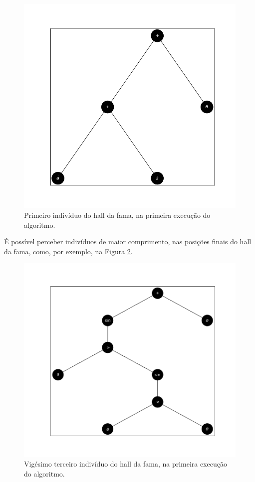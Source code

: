 \begin{figure}[H]
	\centering
	\includegraphics[width=\textwidth]{02_desenvolvimento/04_EC_Fig_CartpoleIndiv1.png}
	\caption{Primeiro indivíduo do hall da fama, na primeira execução do algoritmo.}
	\label{fig:4ec-cartpoleindiv1}
\end{figure}

É possível perceber indivíduos de maior comprimento, nas posições finais do hall da fama, como, por exemplo, na Figura \ref{fig:4ec-cartpoleindiv2}.

\begin{figure}[H]
	\centering
	\includegraphics[width=\textwidth]{02_desenvolvimento/04_EC_Fig_CartpoleIndiv2.png}
	\caption{Vigésimo terceiro indivíduo do hall da fama, na primeira execução do algoritmo.}
	\label{fig:4ec-cartpoleindiv2}
\end{figure}

